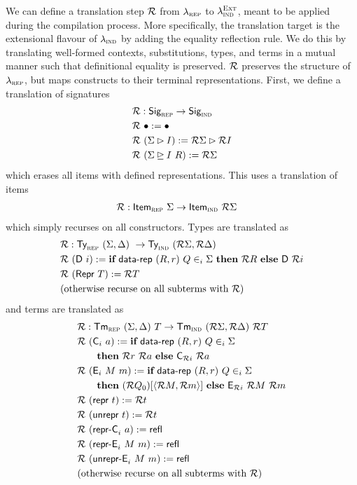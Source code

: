 We can define a translation step $\mathcal{R}$ from $\lambda_{\textsc{rep}}$ to
$\lambda_{\textsc{ind}}^{\textsc{Ext}}$, meant to be applied during the compilation process.
More specifically, the translation target is the extensional flavour of
$\lambda_{\textsc{ind}}$ by adding the equality reflection rule. We do this by translating
well-formed contexts, substitutions, types, and terms in a mutual manner such
that definitional equality is preserved.
$\mathcal{R}$ preserves the structure of
$\lambda_{\textsc{rep}}$, but maps constructs to their terminal representations.
First, we define a translation of signatures
\begin{align*}
& \mathcal{R} : \textsf{Sig}_{\textsc{rep}} \to \textsf{Sig}_{\textsc{ind}} \\
& \mathcal{R}\ \bullet := \bullet \\
& \mathcal{R}\ (\Sigma \rhd I) := \mathcal{R} \Sigma \rhd \mathcal{R} I \\
& \mathcal{R}\ (\Sigma \unrhd I \ R) := \mathcal{R} \Sigma
\end{align*}
which erases all items with defined representations.
This uses a translation of items
\begin{align*}
& \mathcal{R} : \textsf{Item}_{\textsc{rep}}\ \Sigma \to \textsf{Item}_{\textsc{ind}}\ \mathcal{R} \Sigma
\end{align*}
which simply recurses on all constructors. Types are translated as
\begin{align*}
  & \mathcal{R} : \textsf{Ty}_{\textsc{rep}}\ (\Sigma, \Delta)\ \to \textsf{Ty}_{\textsc{ind}}\ (\mathcal{R} \Sigma, \mathcal{R} \Delta) \\
  & \mathcal{R}\ (\textsf{D}\ i) := \textbf{if}\ \textsf{data-rep}\ (R, r)\ Q \in_i \Sigma\ \textbf{then}\ \mathcal{R} R\ \textbf{else}\ \textsf{D}\ \mathcal{R} i \\
  & \mathcal{R}\ (\textsf{Repr}\ T) := \mathcal{R} T \\
  & \text{(otherwise recurse on all subterms with $\mathcal{R}$)}
\end{align*}
and terms are translated as
\begin{align*}
  & \R : \Tm_\rep\ (\Sigma, \Delta)\ T \to \Tm_\ind\ (\R \Sigma, \R \Delta)\ \R T \\
  & \R\ (\mta{C}_i\ a) := \kwd{if}\ \mta{data-rep}\ (R, r)\ Q \in_i \Sigma\ \\
    &\qquad \kwd{then}\ \R r\ \R a\ \kwd{else}\ \mta{C}_{\R i}\ \R a \\
  & \R\ (\mta{E}_i\ M\ m) :=  \kwd{if}\ \mta{data-rep}\ (R, r)\ Q \in_i \Sigma\ \\
    &\qquad \kwd{then}\ (\R Q_0)[\Msub{\R M, \R m}]\ \kwd{else}\ \mta{E}_{\R i}\ \R M\ \R m \\
  & \R\ (\Mrepr\ t) := \R t \\
  & \R\ (\Munrepr\ t) := \R t \\
  & \R\ (\mta{repr-C}_i\ a) := \mta{refl} \\
  & \R\ (\mta{repr-E}_i\ M\ m) := \mta{refl} \\
  & \R\ (\mta{unrepr-E}_i\ M\ m) := \mta{refl} \\
  & \text{(otherwise recurse on all subterms with $\R$)}
\end{align*}

